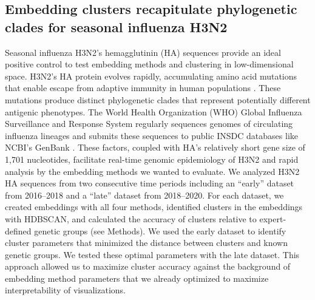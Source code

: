 \documentclass[10pt,letterpaper]{article}
\begin{document}
\subsection*{Embedding clusters recapitulate phylogenetic clades for seasonal influenza H3N2}

Seasonal influenza H3N2's hemagglutinin (HA) sequences provide an ideal positive control to test embedding methods and clustering in low-dimensional space.
H3N2's HA protein evolves rapidly, accumulating amino acid mutations that enable escape from adaptive immunity in human populations \cite{Petrova2018}.
These mutations produce distinct phylogenetic clades that represent potentially different antigenic phenotypes.
The World Health Organization (WHO) Global Influenza Surveillance and Response System regularly sequences genomes of circulating influenza lineages \cite{Hay2018} and submits these sequences to public INSDC databases like NCBI's GenBank \cite{Arita2021}.
These factors, coupled with HA's relatively short gene size of 1,701 nucleotides, facilitate real-time genomic epidemiology of H3N2 \cite{Neher2015} and rapid analysis by the embedding methods we wanted to evaluate.
We analyzed H3N2 HA sequences from two consecutive time periods including an ``early'' dataset from 2016--2018 and a ``late'' dataset from 2018--2020.
For each dataset, we created embeddings with all four methods, identified clusters in the embeddings with HDBSCAN, and calculated the accuracy of clusters relative to expert-defined genetic groups (see Methods).
We used the early dataset to identify cluster parameters that minimized the distance between clusters and known genetic groups.
We tested these optimal parameters with the late dataset.
This approach allowed us to maximize cluster accuracy against the background of embedding method parameters that we already optimized to maximize interpretability of visualizations.
\end{document}
